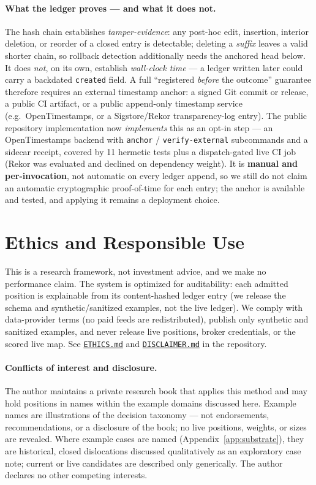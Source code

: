 \documentclass[11pt]{article}
\begin{document}
\paragraph{What the ledger proves --- and what it does not.} The hash chain establishes
\emph{tamper-evidence}: any post-hoc edit, insertion, interior deletion, or reorder of a closed
entry is detectable; deleting a \emph{suffix} leaves a valid shorter chain, so rollback detection
additionally needs the anchored head below. It does \emph{not}, on its own, establish \emph{wall-clock time} --- a ledger written
later could carry a backdated \texttt{created} field. A full ``registered \emph{before} the outcome''
guarantee therefore requires an external timestamp anchor: a signed Git commit or release, a public
CI artifact, or a public append-only timestamp service (e.g.\ OpenTimestamps, or a Sigstore/Rekor
transparency-log entry). The public repository implementation now
\emph{implements} this as an opt-in step --- an
OpenTimestamps backend with \texttt{anchor} / \texttt{verify-external} subcommands and a sidecar
receipt, covered by 11 hermetic tests plus a dispatch-gated live CI job (Rekor was evaluated and
declined on dependency weight). It is \textbf{manual and per-invocation}, not automatic on every
ledger append, so we still do not claim an automatic cryptographic proof-of-time for each entry; the
anchor is available and tested, and applying it remains a deployment choice.

\section{Ethics and Responsible Use}
This is a research framework, not investment advice, and we make no performance claim. The system is
optimized for auditability: each admitted position is explainable from its content-hashed ledger
entry (we release the schema and synthetic/sanitized examples, not the live ledger). We comply with data-provider terms (no paid feeds are redistributed), publish only synthetic
and sanitized examples, and never release live positions, broker credentials, or the scored live map.
See \href{https://github.com/yixingz3/qpop/blob/main/ETHICS.md}{\texttt{ETHICS.md}} and
\href{https://github.com/yixingz3/qpop/blob/main/DISCLAIMER.md}{\texttt{DISCLAIMER.md}} in the repository.

\paragraph{Conflicts of interest and disclosure.} The author maintains a private research book that
applies this method and may hold positions in names within the example domains discussed here.
Example names are illustrations of the decision taxonomy --- not endorsements, recommendations, or a
disclosure of the book; no live positions, weights, or sizes are revealed. Where example
cases are named (Appendix~\ref{app:substrate}), they are historical, closed dislocations
discussed qualitatively as an exploratory case note; current or live candidates are described
only generically. The author declares no other competing interests.
\end{document}
